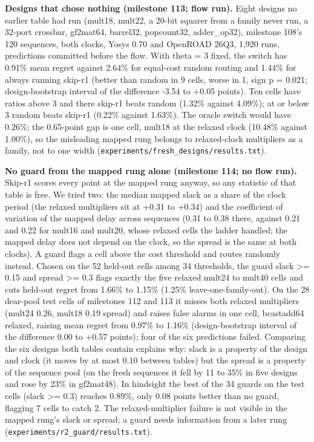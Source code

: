 \documentclass[conference]{IEEEtran}
\begin{document}
\textbf{Designs that chose nothing (milestone 113; flow run).} Eight
designs no earlier table had run (mult18, mult22, a 20-bit squarer from
a family never run, a 32-port crossbar, gf2mat64, barrel32, popcount32,
adder\_op32), milestone 108's 120 sequences, both clocks, Yosys 0.70 and
OpenROAD 26Q3, 1,920 runs, predictions committed before the flow. With
theta = 3 fixed, the switch has 0.91\% mean regret against 2.64\% for
equal-cost random routing and 1.44\% for always running skip-r1 (better
than random in 9 cells, worse in 1, sign p = 0.021; design-bootstrap
interval of the difference -3.54 to +0.05 points). Ten cells have ratios
above 3 and there skip-r1 beats random (1.32\% against 4.09\%); at or
below 3 random beats skip-r1 (0.22\% against 1.63\%). The oracle switch
would have 0.26\%; the 0.65-point gap is one cell, mult18 at the relaxed
clock (10.48\% against 1.00\%), so the misleading mapped rung belongs to
relaxed-clock multipliers as a family, not to one width
(\texttt{experiments/\allowbreak{}fresh\_\allowbreak{}designs/\allowbreak{}results.txt}).

\textbf{No guard from the mapped rung alone (milestone 114; no flow
run).} Skip-r1 scores every point at the mapped rung anyway, so any
statistic of that table is free. We tried two: the median mapped slack
as a share of the clock period (the relaxed multipliers sit at +0.31 to
+0.34) and the coefficient of variation of the mapped delay across
sequences (0.31 to 0.38 there, against 0.21 and 0.22 for mult16 and
mult20, whose relaxed cells the ladder handled; the mapped delay does
not depend on the clock, so the spread is the same at both clocks). A
guard flags a cell above the cost threshold and routes randomly instead.
Chosen on the 52 held-out cells among 34 thresholds, the guard slack
\textgreater= 0.15 and spread \textgreater= 0.3 flags exactly the five
relaxed mult24 to mult40 cells and cuts held-out regret from 1.66\% to
1.15\% (1.25\% leave-one-family-out). On the 28 dear-pool test cells of
milestones 112 and 113 it misses both relaxed multipliers (mult24 0.26,
mult18 0.19 spread) and raises false alarms in one cell, bcastadd64
relaxed, raising mean regret from 0.97\% to 1.16\% (design-bootstrap
interval of the difference 0.00 to +0.57 points); four of the six
predictions failed. Comparing the six designs both tables contain
explains why: slack is a property of the design and clock (it moves by
at most 0.10 between tables) but the spread is a property of the
sequence pool (on the fresh sequences it fell by 11 to 35\% in five
designs and rose by 23\% in gf2mat48). In hindsight the best of the 34
guards on the test cells (slack \textgreater= 0.3) reaches 0.89\%, only
0.08 points better than no guard, flagging 7 cells to catch 2. The
relaxed-multiplier failure is not visible in the mapped rung's slack or
spread; a guard needs information from a later rung
(\texttt{experiments/\allowbreak{}r2\_\allowbreak{}guard/\allowbreak{}results.txt}).
\end{document}
